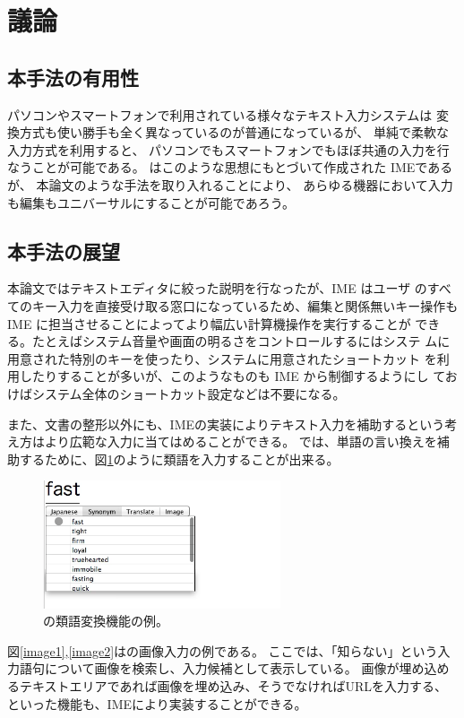 \section{議論}

\subsection{本手法の有用性}

パソコンやスマートフォンで利用されている様々なテキスト入力システムは
変換方式も使い勝手も全く異なっているのが普通になっているが、
単純で柔軟な入力方式を利用すると、
パソコンでもスマートフォンでもほぼ共通の入力を行なうことが可能である。
{\system}はこのような思想にもとづいて作成された IMEであるが、
本論文のような手法を取り入れることにより、
あらゆる機器において入力も編集もユニバーサルにすることが可能であろう。

\subsection{本手法の展望}

本論文ではテキストエディタに絞った説明を行なったが、IME はユーザ
のすべてのキー入力を直接受け取る窓口になっているため、編集と関係無いキー操作も IME に担当させることによってより幅広い計算機操作を実行することが
できる。たとえばシステム音量や画面の明るさをコントロールするにはシステ
ムに用意された特別のキーを使ったり、システムに用意されたショートカット
を利用したりすることが多いが、このようなものも IME から制御するようにし
ておけばシステム全体のショートカット設定などは不要になる。


また、文書の整形以外にも、IMEの実装によりテキスト入力を補助するという考え方はより広範な入力に当てはめることができる。
{\system}では、単語の言い換えを補助するために、図\ref{synonym}のように類語を入力することが出来る。

\begin{figure}[H]
\centerline{\includegraphics[width=70mm,bb=0 0 350 250]{figures/synonym.png}}
\caption{{\system}の類語変換機能の例。}
\label{synonym}
\end{figure}

図\ref{image1},\ref{image2}は{\system}の画像入力の例である。
ここでは、「知らない」という入力語句について画像を検索し、入力候補として表示している。
画像が埋め込めるテキストエリアであれば画像を埋め込み、そうでなければURLを入力する、といった機能も、IMEにより実装することができる。

